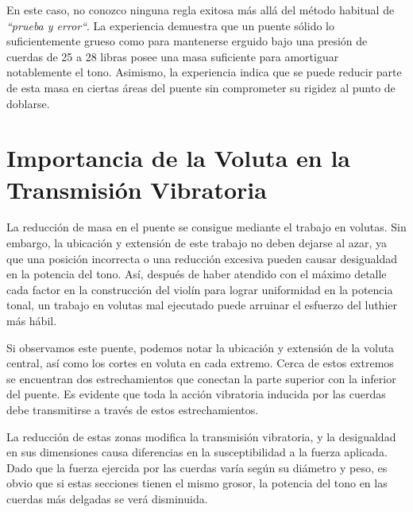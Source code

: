 \documentclass[12pt]{book}
\begin{document}
En este caso, no conozco ninguna regla exitosa más allá del método habitual de \textit{``prueba y error``}. La experiencia demuestra que un puente sólido lo suficientemente grueso como para mantenerse erguido bajo una presión de cuerdas de 25 a 28 libras posee una masa suficiente para amortiguar notablemente el tono. Asimismo, la experiencia indica que se puede reducir parte de esta masa en ciertas áreas del puente sin comprometer su rigidez al punto de doblarse.

\section*{Importancia de la Voluta en la Transmisión Vibratoria}

La reducción de masa en el puente se consigue mediante el trabajo en volutas. Sin embargo, la ubicación y extensión de este trabajo no deben dejarse al azar, ya que una posición incorrecta o una reducción excesiva pueden causar desigualdad en la potencia del tono. Así, después de haber atendido con el máximo detalle cada factor en la construcción del violín para lograr uniformidad en la potencia tonal, un trabajo en volutas mal ejecutado puede arruinar el esfuerzo del luthier más hábil.

Si observamos este puente, podemos notar la ubicación y extensión de la voluta central, así como los cortes en voluta en cada extremo. Cerca de estos extremos se encuentran dos estrechamientos que conectan la parte superior con la inferior del puente. Es evidente que toda la acción vibratoria inducida por las cuerdas debe transmitirse a través de estos estrechamientos. 

La reducción de estas zonas modifica la transmisión vibratoria, y la desigualdad en sus dimensiones causa diferencias en la susceptibilidad a la fuerza aplicada. Dado que la fuerza ejercida por las cuerdas varía según su diámetro y peso, es obvio que si estas secciones tienen el mismo grosor, la potencia del tono en las cuerdas más delgadas se verá disminuida. 
\end{document}
